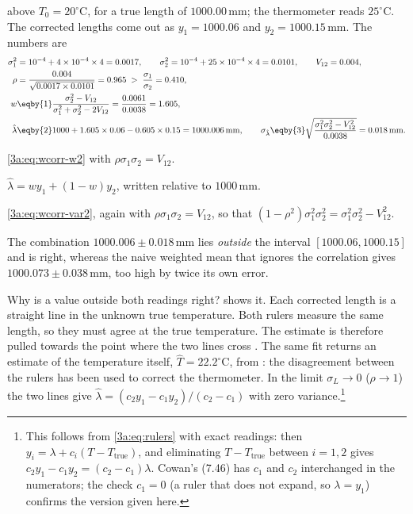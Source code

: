 above $T_0=20^\circ$C, for a true length of $1000.00\,$mm; the thermometer
reads $25^\circ$C. The corrected lengths come out as $y_1=1000.06$ and
$y_2=1000.15\,$mm. The numbers are
\begin{align*}
  \sigma_1^2&=10^{-4}+4\times10^{-4}\times4=0.0017,\qquad
  \sigma_2^2=10^{-4}+25\times10^{-4}\times4=0.0101,\qquad
  V_{12}=0.004,\\
  \rho&=\frac{0.004}{\sqrt{0.0017\times0.0101}}=0.965
  \;>\;\frac{\sigma_1}{\sigma_2}=0.410,\\
  w&\eqby{1}\frac{\sigma_2^2-V_{12}}{\sigma_1^2+\sigma_2^2-2V_{12}}
   =\frac{0.0061}{0.0038}=1.605,\\
  \hat\lambda&\eqby{2}1000+1.605\times0.06-0.605\times0.15=1000.006\,\mathrm{mm},\qquad
  \sigma_{\hat\lambda}\eqby{3}\sqrt{\frac{\sigma_1^2\sigma_2^2-V_{12}^2}{0.0038}}=0.018\,\mathrm{mm}.
\end{align*}
\begin{explain}
  \item \eqref{3a:eq:wcorr-w2} with $\rho\sigma_1\sigma_2=V_{12}$.
  \item $\hat\lambda=wy_1+(1-w)y_2$, written relative to $1000\,$mm.
  \item \eqref{3a:eq:wcorr-var2}, again with $\rho\sigma_1\sigma_2=V_{12}$,
        so that $(1-\rho^2)\sigma_1^2\sigma_2^2=\sigma_1^2\sigma_2^2-V_{12}^2$.
\end{explain}
The combination $1000.006\pm0.018\,$mm lies \emph{outside} the interval
$[1000.06,1000.15]$ and is right, whereas the naive weighted mean that ignores
the correlation gives $1000.073\pm0.038\,$mm, too high by twice its own
error.

Why is a value outside both readings right?  shows it.
Each corrected length is a straight line in the unknown true temperature.
Both rulers measure the same length, so they must agree at the true
temperature. The estimate is therefore pulled towards the point where the
two lines cross . The same fit returns an estimate of
the temperature itself, $\hat T=22.2^\circ$C, from
: the disagreement between the rulers has been used
to correct the thermometer. In the limit $\sigma_L\to0$ ($\rho\to1$) the
two lines give $\hat\lambda=(c_2y_1-c_1y_2)/(c_2-c_1)$ with zero
variance.\footnote{This follows from \eqref{3a:eq:rulers} with exact
readings: then $y_i=\lambda+c_i(T-T_{\text{true}})$, and eliminating
$T-T_{\text{true}}$ between $i=1,2$ gives $c_2y_1-c_1y_2=(c_2-c_1)\lambda$.
Cowan's (7.46) has $c_1$ and $c_2$ interchanged in the numerators; the
check $c_1=0$ (a ruler that does not expand, so $\lambda=y_1$) confirms the
version given here.}

